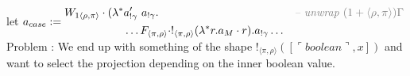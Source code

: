 \documentclass[12pt,a4paper]{article}
\begin{document}
let $a_{case} \define
\begin{aligned}
  W_{1 \langle\rho , \pi \rangle} \cdot (\lambda^* & a'_{!\gamma}\ a_{!\gamma}.  &&\comment{-- unwrap $(1  + \langle \rho , \pi \rangle) \Gamma$}\\
  & \dots F_{\langle \pi , \rho \rangle} \cdot !_{\langle \pi , \rho \rangle}(\lambda^* r. a_M \cdot r ) . a_{!\gamma} \dots &&
\end{aligned}$\\
Problem : We end up with something of the shape $!_{\langle \pi , \rho \rangle}([\ulcorner boolean \urcorner,  x ])$ and want to select the projection depending on the inner boolean value.
\end{document}
